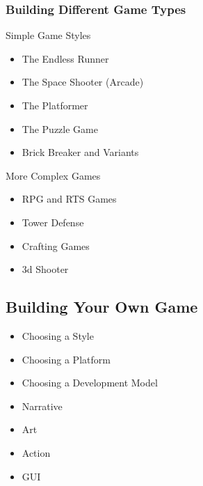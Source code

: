 \documentclass[letterpaper,10pt,english]{sphinxmanual}
\begin{document}
\subsubsection{Building Different Game Types}
\label{gamedev:building-different-game-types}
Simple Game Styles
\begin{itemize}
\item {} 
The Endless Runner

\item {} 
The Space Shooter (Arcade)

\item {} 
The Platformer

\item {} 
The Puzzle Game

\item {} 
Brick Breaker and Variants

\end{itemize}

More Complex Games
\begin{itemize}
\item {} 
RPG and RTS Games

\item {} 
Tower Defense

\item {} 
Crafting Games

\item {} 
3d Shooter

\end{itemize}


\subsection{Building Your Own Game}
\label{gamedev:building-your-own-game}\begin{itemize}
\item {} 
Choosing a Style

\item {} 
Choosing a Platform

\item {} 
Choosing a Development Model

\item {} 
Narrative

\item {} 
Art

\item {} 
Action

\item {} 
GUI

\end{itemize}
\end{document}
